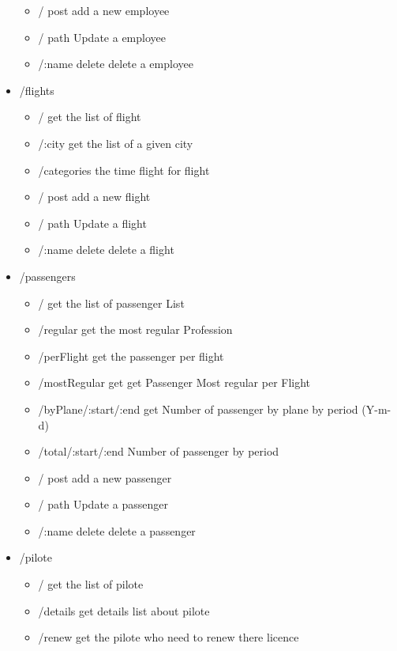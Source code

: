 \documentclass{article}
\begin{document}
\begin{itemize}
\begin{itemize}
                \item / post add a new employee  
                \item / path Update a employee
                \item /:name delete delete a employee
            \end{itemize}
        \item /flights
            \begin{itemize}
                \item / get the list of flight
                \item /:city get the list of a given city
                \item /categories the time flight for flight
                \item / post add a new flight  
                \item / path Update a flight
                \item /:name delete delete a flight
            \end{itemize}
        \item /passengers
            \begin{itemize}
                \item / get the list of passenger List
                \item /regular get the most regular Profession
                \item /perFlight get the passenger per flight
                \item /mostRegular get get Passenger Most regular per Flight
                \item /byPlane/:start/:end get Number of passenger by plane by period (Y-m-d)
                \item /total/:start/:end Number of passenger by period
                \item / post add a new passenger  
                \item / path Update a passenger
                \item /:name delete delete a passenger
            \end{itemize}       
        \item /pilote
            \begin{itemize}
                \item / get the list of pilote
                \item /details get details list about pilote
                \item /renew get the pilote who need to renew there licence

\end{itemize}
\end{itemize}
\end{document}
